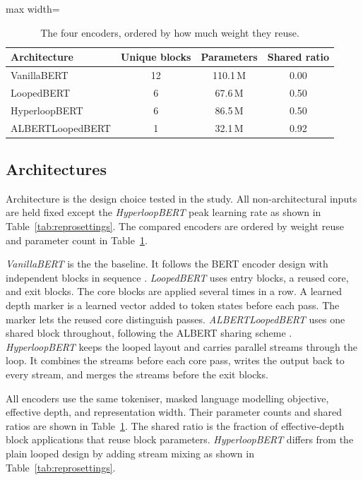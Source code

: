 \documentclass[sigconf,natbib=true,anonymous=true]{acmart}
\begin{document}
\begin{table}[!htp]
\centering
\caption{The four encoders, ordered by how much weight they reuse.}
\label{tab:arch}
\small
\begin{adjustbox}{max width=\columnwidth}
\begin{tabular}{lccc}
\toprule
Architecture & Unique blocks & Parameters & Shared ratio \\
\midrule
VanillaBERT \citep{devlin2019bert}          & 12 & 110.1\,M & 0.00 \\
LoopedBERT \citep{saunshi2025looped}        &  6 &  67.6\,M & 0.50 \\
HyperloopBERT \citep{zeitoun2026hyperloop}  &  6 &  86.5\,M & 0.50 \\
ALBERTLoopedBERT \citep{lan2020albert}      &  1 &  32.1\,M & 0.92 \\
\bottomrule
\end{tabular}
\end{adjustbox}
\end{table}

\subsection{Architectures}

Architecture is the design choice tested in the study. All non-architectural
inputs are held fixed except the \emph{HyperloopBERT} peak learning rate as shown in
Table~\ref{tab:reprosettings}. The compared encoders are ordered by weight reuse
and parameter count in Table~\ref{tab:arch}.

\emph{VanillaBERT} is the the baseline. It follows the BERT encoder design
with independent blocks in sequence \citep{devlin2019bert}. \emph{LoopedBERT}
uses entry blocks, a reused core, and exit blocks. The core blocks are applied several times in a row. A
learned depth marker is a learned vector added to token states before each pass.
The marker lets the reused core distinguish passes. \emph{ALBERTLoopedBERT}
uses one shared block throughout, following the ALBERT sharing scheme
\citep{lan2020albert}. \emph{HyperloopBERT} keeps the looped layout and carries
parallel streams through the loop. It combines the streams before each core
pass, writes the output back to every stream, and merges the streams before the
exit blocks.

All encoders use the same tokeniser, masked language modelling objective,
effective depth, and representation width. Their parameter counts and shared
ratios are shown in Table~\ref{tab:arch}. The shared ratio is the fraction of
effective-depth block applications that reuse block parameters.
\emph{HyperloopBERT} differs from the plain looped design by adding stream
mixing as shown in
Table~\ref{tab:reprosettings}. 
\end{document}
